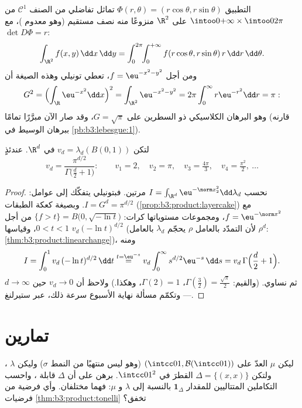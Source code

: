 \begin{example}
\label{ex:b3:product:polar}
التطبيق $\Phi(r, \theta) = (r\cos\theta, r\sin\theta)$ تماثل تفاضلي من الصنف $\mathcal
C^1$ من $\intoo0{+\infty}\times\intoo0{2\pi}$ على
$\R^2$ منزوعًا منه نصف مستقيم (وهو معدوم )، مع
$\det D\Phi =
r$:
\[
\int_{\R^2}f(x, y)\,\dd x\,\dd y
= \int_0^{2\pi}\!\!\int_0^{+\infty}
f(r\cos\theta, r\sin\theta)\,r\,\dd r\,\dd\theta .
\]
ومن أجل $f = \eu^{-x^2-y^2}$، تعطي تونيلي وهذه الصيغة أن
\[
G^2 = \Bigl(\int_\R \eu^{-x^2}\dd x\Bigr)^2
= \int_{\R^2}\eu^{-x^2-y^2}
= 2\pi\int_0^\infty r\eu^{-r^2}\dd r = \pi:
\]
وهو البرهان الكلاسيكي ذو السطرين على $G = \sqrt\pi$، وقد صار
الآن مبرَّرًا تمامًا (قارنه ببرهان الوسيط في \cref{pb:b3:lebesgue:1}).
\end{example}

\begin{theorem}
\label{thm:b3:product:ballvolume}
لتكن $v_d = \lambda_d(B(0,1))$ في $\R^d$. عندئذٍ
\[
v_d = \frac{\pi^{d/2}}{\Gamma\bigl(\frac d2 + 1\bigr)} :
\qquad
v_1 = 2,\quad v_2 = \pi,\quad v_3 = \tfrac{4\pi}3,\quad
v_4 = \tfrac{\pi^2}2,\ \dots
\]
\end{theorem}

\begin{proof}
نحسب $I = \int_{\R^d}\eu^{-\norm x_2^2}\dd\lambda_d$ مرتين. فبتونيلي يتفكّك إلى عوامل: $I = G^d = \pi^{d/2}$. وبصيغة
كعكة الطبقات (\cref{prop:b3:product:layercake}) مع $f = \eu^{-
\norm x^2}$، ومجموعات مستوياتها
كرات: $\{f > t\} =
B\bigl(0, \sqrt{-\ln t}\bigr)$ من أجل $0 < t < 1$، وقياسها $v_d(-\ln t)^{d/2}$ (لأن التمدّد
بالعامل $\rho$ يحجّم $\lambda_d$ بالعامل $\rho^d$: \cref{thm:b3:product:linearchange})،
ومنه
\[
I = \int_0^1 v_d\,(-\ln t)^{d/2}\,\dd t
\overset{t = \eu^{-s}}{=}
v_d\int_0^\infty s^{d/2}\eu^{-s}\,\dd s
= v_d\,\Gamma\Bigl(\frac d2 + 1\Bigr).
\]
ثم نساوي. (والقيم: $\Gamma(\frac32) = \frac{\sqrt\pi}2$، $\Gamma(2) = 1$، وهكذا.) ولاحظ أن
$v_d \to 0$ حين $d \to \infty$ --- وتكمّم مسألة نهاية الأسبوع
سرعة ذلك، عبر ستيرلنغ.
\end{proof}

\section{تمارين}

\begin{exercise}[$\star$]\label{exo:b3:product:1}
ليكن $\mu$  العدّ على $(\intcc01, \mathcal
B(\intcc01))$ (وهو ليس منتهيًا من النمط
$\sigma$) وليكن $\lambda$ ، ولتكن $\Delta = \{(x,x)\}$ القطرَ في
$\intcc01^2$. برهن على أن $\Delta$ قابلة ، واحسب
التكاملين المتتاليين للمقدار $\mathbf 1_\Delta$ بالنسبة إلى $\lambda$
و $\mu$: فهما مختلفان. وأي فرضية من فرضيات \cref{thm:b3:product:tonelli} تخفق؟
\end{exercise}

